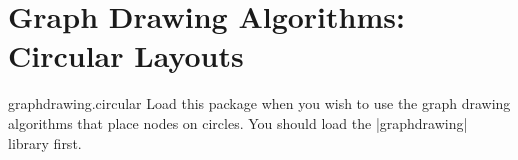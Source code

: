 %
%
%

\section{Graph Drawing Algorithms: Circular Layouts}

{}


\begin{tikzlibrary}{graphdrawing.circular}
  Load this package when you wish to use the graph drawing algorithms
  that place nodes on circles. You should load the |graphdrawing| library first.
\end{tikzlibrary}


